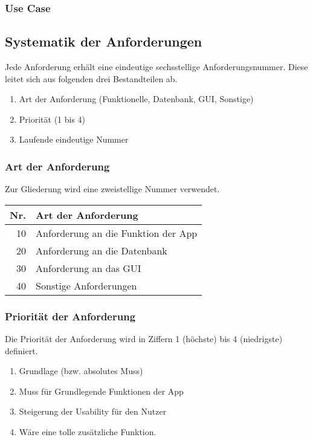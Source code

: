 \subsubsection{Use Case }

\subsection{Systematik der Anforderungen}

Jede Anforderung erhält eine eindeutige sechsstellige Anforderungsnummer. Diese leitet sich aus folgenden drei Bestandteilen ab.

\begin{enumerate}
	\item Art der Anforderung (Funktionelle, Datenbank, GUI, Sonstige)
	\item Priorität (1 bis 4)
	\item Laufende eindeutige Nummer
\end{enumerate} 

\subsubsection{Art der Anforderung}

Zur Gliederung wird eine zweistellige Nummer verwendet.

\begin{table} [htbp]
	\begin{tabular}{r|l}
		\textbf{Nr.} & \textbf{Art der Anforderung} \\ \hline
		10 & Anforderung an die Funktion der App \\
		\rowcolor{DarkSeaGreen} 20 & Anforderung an die Datenbank \\
		30 & Anforderung an das GUI \\
		\rowcolor{DarkSeaGreen} 40 & Sonstige Anforderungen
	\end{tabular}
\end{table}

\subsubsection{Priorität der Anforderung}

Die Priorität der Anforderung wird in Ziffern 1 (höchste) bis 4 (niedrigste) definiert.

\begin{enumerate}
	\item Grundlage (bzw. absolutes Muss)
	\item Muss für Grundlegende Funktionen der App
	\item Steigerung der Usability für den Nutzer
	\item Wäre eine tolle zusätzliche Funktion.
\end{enumerate}


